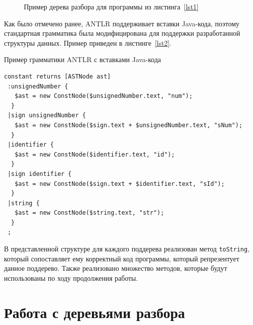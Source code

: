 \begin{figure}[!h] 
\caption{Пример дерева разбора для программы из листинга~\ref{lst1}}\label{fig1} 
\begin{center}
\end{center}
\end{figure}

Как было отмечено ранее, ANTLR поддерживает вставки Java-кода, поэтому стандартная грамматика была модифицирована для поддержки
разработанной структуры данных. Пример приведен в листинге~\ref{lst2}. 

\begin{algorithm}[!h] 
\caption{Пример грамматики ANTLR с вставками Java-кода}\label{lst2} 
\begin{lstlisting}[basicstyle=\small] 
constant returns [ASTNode ast]
 :unsignedNumber {
   $ast = new ConstNode($unsignedNumber.text, "num");
  }
 |sign unsignedNumber {
   $ast = new ConstNode($sign.text + $unsignedNumber.text, "sNum");
  }
 |identifier {
   $ast = new ConstNode($identifier.text, "id");
  }
 |sign identifier {
   $ast = new ConstNode($sign.text + $identifier.text, "sId");
  }
 |string {
   $ast = new ConstNode($string.text, "str");
  }
 ; 
\end{lstlisting} 
\end{algorithm}

В представленной структуре для каждого поддерева реализован метод \texttt{toString}, который сопоставляет ему
корректный код программы, который репрезентует данное поддерево. Также реализовано множество методов, которые
будут использованы по ходу продолжения работы.

\section{Работа с деревьями разбора}

